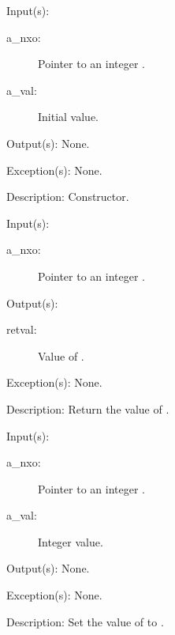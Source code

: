 \begin{capi}
\label{nxo_integer_new}
	\begin{capilist}
	\item[Input(s): ]
		\begin{description}\item[]
		\item[a\_nxo: ]
			Pointer to an integer .
		\item[a\_val: ]
			Initial value.
		\end{description}
	\item[Output(s): ] None.
	\item[Exception(s): ] None.
	\item[Description: ]
		Constructor.
	\end{capilist}
\label{nxo_integer_get}
	\begin{capilist}
	\item[Input(s): ]
		\begin{description}\item[]
		\item[a\_nxo: ]
			Pointer to an integer \classname{nxo}.
		\end{description}
	\item[Output(s): ]
		\begin{description}\item[]
		\item[retval: ]
			Value of \cvar{a\_nxo}.
		\end{description}
	\item[Exception(s): ] None.
	\item[Description: ]
		Return the value of \cvar{a\_nxo}.
	\end{capilist}
\label{nxo_integer_set}
	\begin{capilist}
	\item[Input(s): ]
		\begin{description}\item[]
		\item[a\_nxo: ]
			Pointer to an integer .
		\item[a\_val: ]
			Integer value.
		\end{description}
	\item[Output(s): ] None.
	\item[Exception(s): ] None.
	\item[Description: ]
		Set the value of  to \cvar{a\_val}.
	\end{capilist}
\end{capi}
